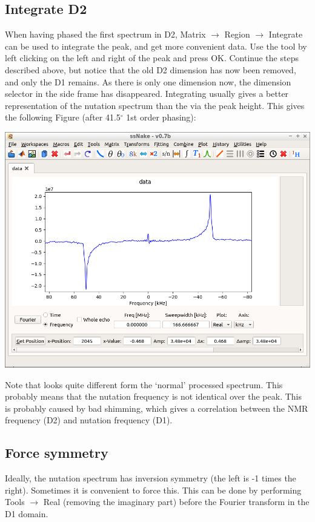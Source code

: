 \documentclass[11pt,a4paper]{article}
\begin{document}
\subsection{Integrate D2}
When having phased the first spectrum in D2, Matrix $\longrightarrow$ Region $\longrightarrow$ Integrate can be used to integrate the peak, and get more convenient data. Use the tool by left clicking on the left and right of the peak and press OK. Continue the steps described above, but notice that the old D2 dimension has now been removed, and only the D1 remains. As there is only one dimension now, the dimension selector in the side frame has disappeared. Integrating usually gives a better representation of the nutation spectrum than the via the peak height. This gives the following Figure (after 41.5$^\circ$ 1st order phasing):
\begin{center}
\includegraphics[width=0.8\linewidth]{Figs/Fig5.png}
\end{center}
Note that looks quite different form the `normal' processed spectrum. This probably means that the nutation frequency is not identical over the peak. This is probably caused by bad shimming, which gives a correlation between the NMR frequency (D2) and nutation frequency (D1).



\subsection{Force symmetry}
Ideally, the nutation spectrum has inversion symmetry (the left is -1 times the right). Sometimes it is convenient to force this. This can be done by performing Tools $\longrightarrow$ Real (removing the imaginary part) before the Fourier transform in the D1 domain.
\end{document}
